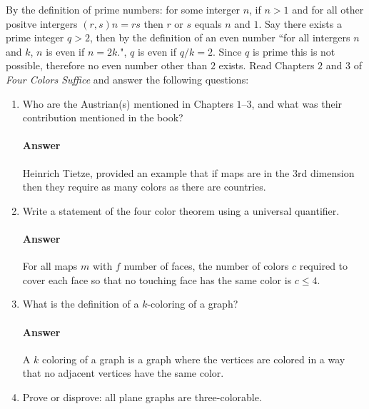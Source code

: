 \documentclass{article}
\begin{document}
By the definition of prime numbers: for some interger $n$, if $n>1$ and for all other positve intergers $(r,s) n=rs$ then $r$ or $s$ equals $n$ and $1$. Say there exists a prime integer $q>2$, then by the definition of an even number ``for all intergers $n$ and $k$, $n$ is even if $n=2k$.", $q$ is even if $q/k=2$. Since $q$ is prime this is not possible, therefore no even number other than $2$ exists.
%
\collab{\todo{}}
Read Chapters $2$ and $3$ of \emph{Four Colors Suffice} and answer the following questions:

\begin{enumerate}

    \item Who are the Austrian(s) mentioned in Chapters $1$--$3$, and what was their
        contribution mentioned in the book?

        \paragraph{Answer}
       Heinrich Tietze, provided an example that if maps are in the 3rd dimension then they require as many colors as there are countries.

    \item Write a statement of the four color theorem using a universal
        quantifier.

        \paragraph{Answer}
        For all maps $m$ with $f$ number of faces, the number of colors $c$ required to cover each face so that no touching face has the same color is $c \leq 4$.

    \item What is the definition of a $k$-coloring of a graph?

        \paragraph{Answer}
        A $k$ coloring of a graph is a graph where the vertices are colored in a way that no adjacent vertices have the same color.

    \item Prove or disprove: all plane graphs are three-colorable.


\end{enumerate}
\end{document}
